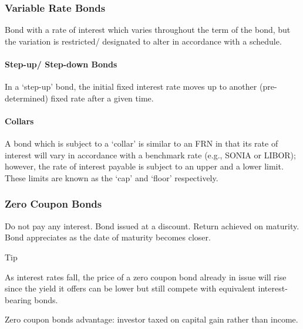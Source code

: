 \documentclass[
]{article}
\newenvironment{env-100773c6-502e-49a1-b0f0-49a30dbf5b8e}
{
    \savenotes\tcolorbox[blanker,breakable,left=5pt,borderline west={2pt}{-4pt}{cyan}]
}
{
    \endtcolorbox\spewnotes
}
\begin{document}
\hypertarget{variable-rate-bonds}{%
\subsubsection{Variable Rate Bonds}\label{variable-rate-bonds}}

Bond with a rate of interest which varies throughout the term of the
bond, but the variation is restricted/ designated to alter in accordance
with a schedule.

\hypertarget{step-up-step-down-bonds}{%
\paragraph{Step-up/ Step-down Bonds}\label{step-up-step-down-bonds}}

In a `step-up' bond, the initial fixed interest rate moves up to another
(pre-determined) fixed rate after a given time.

\hypertarget{collars}{%
\paragraph{Collars}\label{collars}}

A bond which is subject to a `collar' is similar to an FRN in that its
rate of interest will vary in accordance with a benchmark rate (e.g.,
SONIA or LIBOR); however, the rate of interest payable is subject to an
upper and a lower limit. These limits are known as the `cap' and `floor'
respectively.

\hypertarget{zero-coupon-bonds}{%
\subsubsection{Zero Coupon Bonds}\label{zero-coupon-bonds}}

Do not pay any interest. Bond issued at a discount. Return achieved on
maturity. Bond appreciates as the date of maturity becomes closer.

\begin{env-100773c6-502e-49a1-b0f0-49a30dbf5b8e}

Tip

As interest rates fall, the price of a zero coupon bond already in issue
will rise since the yield it offers can be lower but still compete with
equivalent interest-bearing bonds.

\end{env-100773c6-502e-49a1-b0f0-49a30dbf5b8e}

Zero coupon bonds advantage: investor taxed on capital gain rather than
income.
\end{document}
